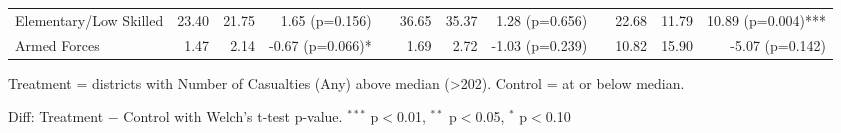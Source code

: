 \begin{table}[htbp]
\begin{tabular}{l rrr c rrr c rrr}
\quad Elementary/Low Skilled & 23.40 & 21.75 & 1.65 (p=0.156) &  & 36.65 & 35.37 & 1.28 (p=0.656) &  & 22.68 & 11.79 & 10.89 (p=0.004)*** \\
\quad Armed Forces & 1.47 & 2.14 & -0.67 (p=0.066)* &  & 1.69 & 2.72 & -1.03 (p=0.239) &  & 10.82 & 15.90 & -5.07 (p=0.142) \\
\bottomrule
\end{tabular}
\begin{tablenotes}
\small
\item Treatment = districts with Number of Casualties (Any) above median (>202). Control = at or below median.
\item Diff: Treatment $-$ Control with Welch's t-test p-value. $^{{***}}$ p$<$0.01, $^{{**}}$ p$<$0.05, $^{{*}}$ p$<$0.10
\end{tablenotes}
\end{table}

\clearpage

